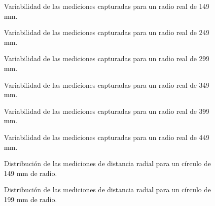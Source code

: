 \begin{figure}[H]
	\centering
	\caption{Variabilidad de las mediciones capturadas para un radio real de 149 mm.}
	\label{fig:lecturas2}
\end{figure}

\begin{figure}[H]
	\centering
	\caption{Variabilidad de las mediciones capturadas para un radio real de 249 mm.}
	\label{fig:lecturas3}
\end{figure}

\begin{figure}[H]
	\centering
	\caption{Variabilidad de las mediciones capturadas para un radio real de 299 mm.}
	\label{fig:lecturas4}
\end{figure}

\begin{figure}[H]
	\centering
	\caption{Variabilidad de las mediciones capturadas para un radio real de 349 mm.}
	\label{fig:lecturas5}
\end{figure}

\begin{figure}[H]
	\centering
	\caption{Variabilidad de las mediciones capturadas para un radio real de 399 mm.}
	\label{fig:lecturas6}
\end{figure}

\begin{figure}[H]
	\centering
	\caption{Variabilidad de las mediciones capturadas para un radio real de 449 mm.}
	\label{fig:lecturas7}
\end{figure}

\begin{figure}[H]
	\centering
	\caption{Distribución de las mediciones de distancia radial para un círculo de 149 mm de radio.}
	\label{fig:histograma_dists1}
\end{figure}

\begin{figure}[H]
	\centering
	\caption{Distribución de las mediciones de distancia radial para un círculo de 199 mm de radio.}
	\label{fig:histograma_dists2}
\end{figure}

